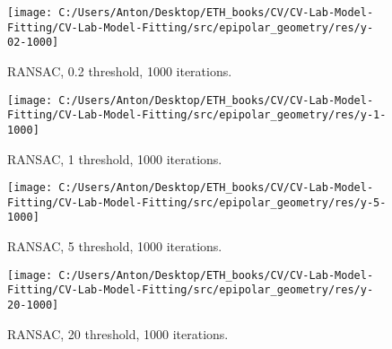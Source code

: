 \documentclass{report}
\begin{document}
	\begin{figure}[h!]
	\begin{center}
		\begin{minipage}[h]{0.9\linewidth}
			\texttt{[image: C:/Users/Anton/Desktop/ETH\_books/CV/CV-Lab-Model-Fitting/CV-Lab-Model-Fitting/src/epipolar\_geometry/res/y-02-1000]}
			\caption{RANSAC, 0.2 threshold, 1000 iterations.}
		\end{minipage}
	\end{center}
\end{figure} 
\begin{figure}[h!]
	\begin{center}
		\begin{minipage}[h]{0.9\linewidth}
			\texttt{[image: C:/Users/Anton/Desktop/ETH\_books/CV/CV-Lab-Model-Fitting/CV-Lab-Model-Fitting/src/epipolar\_geometry/res/y-1-1000]}
			\caption{RANSAC, 1 threshold, 1000 iterations.}
		\end{minipage}
	\end{center}
\end{figure}
\begin{figure}[h!]
	\begin{center}
		\begin{minipage}[h]{0.9\linewidth}
			\texttt{[image: C:/Users/Anton/Desktop/ETH\_books/CV/CV-Lab-Model-Fitting/CV-Lab-Model-Fitting/src/epipolar\_geometry/res/y-5-1000]}
			\caption{RANSAC, 5 threshold, 1000 iterations.}
		\end{minipage}
	\end{center}
\end{figure}

\begin{figure}[h!]
	\begin{center}
		\begin{minipage}[h]{0.9\linewidth}
			\texttt{[image: C:/Users/Anton/Desktop/ETH\_books/CV/CV-Lab-Model-Fitting/CV-Lab-Model-Fitting/src/epipolar\_geometry/res/y-20-1000]}
			\caption{RANSAC, 20 threshold, 1000 iterations.}
		\end{minipage}
	\end{center}
\end{figure}
\end{document}
